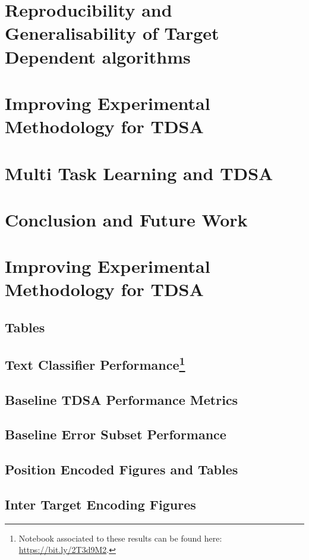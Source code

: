 \documentclass[11pt]{report}
\begin{document}
\chapter{Reproducibility and Generalisability of Target Dependent algorithms}
\label{chapter:reproducibility}

\chapter{Improving Experimental Methodology for TDSA}

\chapter{Multi Task Learning and TDSA}
\chapter{Conclusion and Future Work}
\appendix
\chapter{Improving Experimental Methodology for TDSA}
\section{Tables}

\section{Text Classifier Performance\footnote{Notebook associated to these results can be found here: \url{https://bit.ly/2T3d9M2}.}}
\label{section:appendix_cnn_tdsa_baseline}

\section{Baseline TDSA Performance Metrics}
\label{section:appendix_tdsa_baseline_metrics}

\section{Baseline Error Subset Performance}
\label{section:appendix_baseline_error_subset_performance}

\section{Position Encoded Figures and Tables}
\label{section:appendix_position_encoded_figures_and_tables}

\section{Inter Target Encoding Figures}
\label{section:appendix_inter_target_encoding_figures_and_tables}




\printbibliography
\end{document}
